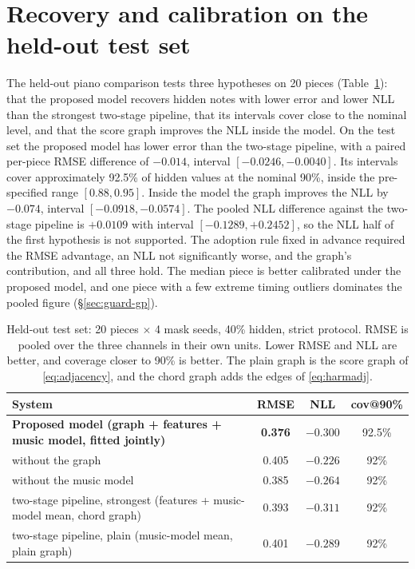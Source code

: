 \documentclass[11pt,a4paper]{report}
\newcommand{\maskRate}{40\%}
\newcommand{\nConfPieces}{20}
\newcommand{\rmseGP}{0.376}            %
\newcommand{\nllGP}{$-0.300$}
\newcommand{\covGP}{92.5\%}
\newcommand{\rmseConfOldHead}{0.393}   %
\newcommand{\nllConfOldHead}{$-0.311$}
\newcommand{\dRmseConf}{$-0.014$}      %
\newcommand{\dNllGraphConf}{$-0.074$}  %
\begin{document}
\section{Recovery and calibration on the held-out test set}
The held-out piano comparison tests three hypotheses on \nConfPieces{}
pieces (Table~\ref{tab:headline-conf}): that the proposed model recovers
hidden notes with lower error and lower NLL than the strongest two-stage
pipeline, that its intervals cover close to the nominal level, and that the
score graph improves the NLL inside the model. On the test set the proposed model has lower
error than the two-stage pipeline, with a paired per-piece RMSE difference of
\dRmseConf{}, interval $[-0.0246, -0.0040]$. Its intervals cover
approximately \covGP{} of hidden values at the nominal 90\%, inside the
pre-specified range $[0.88, 0.95]$. Inside the model the graph improves the
NLL by \dNllGraphConf{}, interval $[-0.0918, -0.0574]$. The pooled NLL
difference against the two-stage pipeline is $+0.0109$ with interval
$[-0.1289, +0.2452]$, so the NLL half of the first hypothesis is not
supported. The adoption rule fixed in advance required the RMSE advantage,
an NLL not significantly worse, and the graph's contribution, and all three
hold. The median piece is better
calibrated under the proposed model, and one piece with a few extreme timing
outliers dominates the pooled figure (\S\ref{sec:guard-gp}).

\begin{table}[h]\centering
\caption{Held-out test set: \nConfPieces{} pieces $\times$ 4 mask seeds,
\maskRate{} hidden, strict protocol. RMSE is pooled over the three channels
in their own units. Lower RMSE and NLL are better, and coverage closer to
90\% is better. The plain graph is the score graph of
\eqref{eq:adjacency}, and the chord graph adds the edges of
\eqref{eq:harmadj}.}
\label{tab:headline-conf}
\footnotesize
\begin{tabular}{lccc}
\toprule
System & RMSE & NLL & cov@90\% \\
\midrule
\textbf{Proposed model (graph + features + music model, fitted jointly)} & \textbf{\rmseGP} & \nllGP & \covGP \\
\quad without the graph & 0.405 & $-0.226$ & 92\% \\
\quad without the music model & 0.385 & $-0.264$ & 92\% \\
two-stage pipeline, strongest (features + music-model mean, chord graph) & \rmseConfOldHead & \nllConfOldHead & 92\% \\
two-stage pipeline, plain (music-model mean, plain graph) & 0.401 & $-0.289$ & 92\% \\
\bottomrule
\end{tabular}
\end{table}
\end{document}
